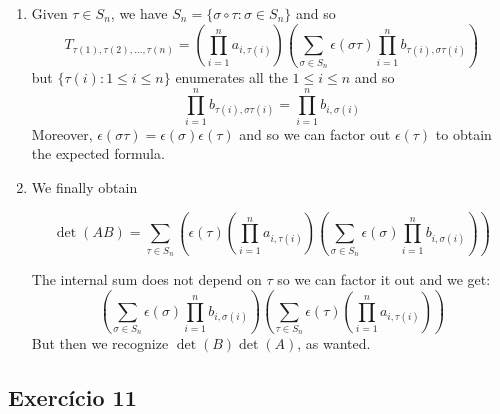 \begin{enumerate}
\item Given $\tau \in S_n$, we have
  $S_n = \{ \sigma \circ \tau : \sigma \in S_n \}$ and so
  $$T_{\tau{(1)},\tau{(2)},\dots,\tau{(n)}} =
  \left(\prod_{i=1}^n a_{i,\tau{(i)}}\right)\left(
  \sum_{\sigma \in S_n} \epsilon{(\sigma \tau)}
  {\prod_{i=1}^n b_{\tau{(i)},\sigma \tau{(i)}}}\right)
  $$
  but $\{ \tau(i) : 1 \leq i \leq n \}$ enumerates all the
  $1 \leq i \leq n$ and so
  $$
  {\prod_{i=1}^n b_{\tau{(i)},\sigma \tau{(i)}}} =
    {\prod_{i=1}^n b_{i,\sigma{(i)}}}
    $$
    Moreover, $\epsilon{(\sigma \tau)} =
    \epsilon{(\sigma)} \epsilon{(\tau)}$ and so we can factor out
    $\epsilon{(\tau)}$ to obtain the expected formula.

  \item We finally obtain


    $$\det(AB) = \sum_{\tau \in S_n}
    \left(
  \epsilon{(\tau)}
     \left(\prod_{i=1}^n a_{i,\tau{(i)}}\right)
  \left(\sum_{\sigma \in S_n}
     \epsilon{(\sigma)}
     {\prod_{i=1}^n b_{i,\sigma(i)}}\right)
    \right)$$

    The internal sum does not depend on $\tau$ so we can factor it out and we
    get:
    $$\left(\sum_{\sigma \in S_n}
     \epsilon{(\sigma)}
     {\prod_{i=1}^n b_{i,\sigma(i)}}\right)
     \left(\sum_{\tau \in S_n}
    \epsilon{(\tau)}
     \left(\prod_{i=1}^n a_{i,\tau{(i)}}\right)
     \right)$$
     But then we recognize $\det(B) \det(A)$, as wanted.
  \end{enumerate}

\subsection*{Exercício 11}


